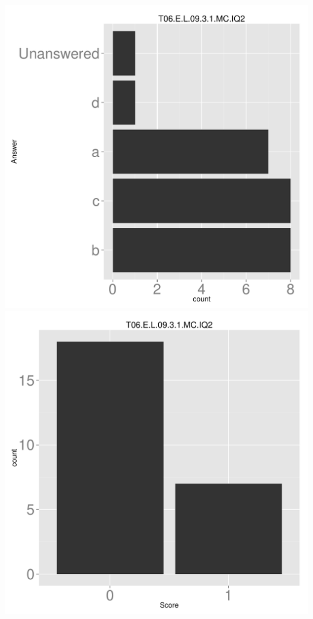 \documentclass[12pt,nohyper]{tufte-handout}\usepackage[]{graphicx}\usepackage[]{color}
\begin{document}
\begin{center} \includegraphics[width=.45\linewidth]{Topic06_43_answer} \includegraphics[width=.45\linewidth]{Topic06_43_score} \end{center} 
\end{document}
